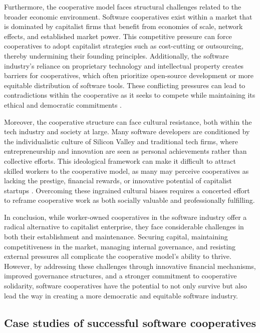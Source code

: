 \begin{refsection}
Furthermore, the cooperative model faces structural challenges related to the broader economic environment. Software cooperatives exist within a market that is dominated by capitalist firms that benefit from economies of scale, network effects, and established market power. This competitive pressure can force cooperatives to adopt capitalist strategies such as cost-cutting or outsourcing, thereby undermining their founding principles. Additionally, the software industry’s reliance on proprietary technology and intellectual property creates barriers for cooperatives, which often prioritize open-source development or more equitable distribution of software tools. These conflicting pressures can lead to contradictions within the cooperative as it seeks to compete while maintaining its ethical and democratic commitments \cite[pp.~130-132]{schweickart2002}.

Moreover, the cooperative structure can face cultural resistance, both within the tech industry and society at large. Many software developers are conditioned by the individualistic culture of Silicon Valley and traditional tech firms, where entrepreneurship and innovation are seen as personal achievements rather than collective efforts. This ideological framework can make it difficult to attract skilled workers to the cooperative model, as many may perceive cooperatives as lacking the prestige, financial rewards, or innovative potential of capitalist startups \cite[pp.~191-193]{vieta2020}. Overcoming these ingrained cultural biases requires a concerted effort to reframe cooperative work as both socially valuable and professionally fulfilling.

In conclusion, while worker-owned cooperatives in the software industry offer a radical alternative to capitalist enterprise, they face considerable challenges in both their establishment and maintenance. Securing capital, maintaining competitiveness in the market, managing internal governance, and resisting external pressures all complicate the cooperative model’s ability to thrive. However, by addressing these challenges through innovative financial mechanisms, improved governance structures, and a stronger commitment to cooperative solidarity, software cooperatives have the potential to not only survive but also lead the way in creating a more democratic and equitable software industry.

\subsection{Case studies of successful software cooperatives}


\end{refsection}
